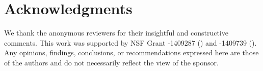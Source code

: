 \documentclass[sigconf]{acmart}
\newcommand{\latexfile}[1]{}
\begin{document}
\latexfile{10-introduction}
\latexfile{20-background}
\latexfile{30-method}
\latexfile{40-results}
\latexfile{50-discussion}
\latexfile{60-conclusion}

\section{Acknowledgments}
We thank the anonymous reviewers for their insightful and constructive
comments. This work was supported by NSF Grant -1409287 () and -1409739 ().
Any opinions, findings,
conclusions, or recommendations expressed here are those of the
authors and do not necessarily reflect the view of the sponsor.

\clearpage



\end{document}
